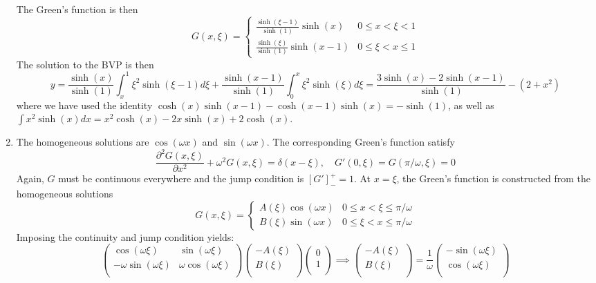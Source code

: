 \documentclass[a4paper]{article}
\begin{document}
\begin{ans}
\begin{enumerate}[label=(\alph*)]
The Green's function is then 
$$G(x,\xi)=
\left\{
        \begin{array}{ll}
      \frac{\sinh(\xi-1)}{\sinh(1)}\sinh(x) & 0\leq x<\xi<1 \\
      \frac{\sinh(\xi)}{\sinh(1)}\sinh(x-1) & 0\leq\xi< x\leq 1 
        \end{array}
    \right.$$
The solution to the BVP is then
$$y=\frac{\sinh(x)}{\sinh(1)}\int_x^1\xi^2\sinh(\xi-1)d\xi+\frac{\sinh(x-1)}{\sinh(1)}\int_0^x\xi^2\sinh(\xi)d\xi=\frac{3\sinh(x)-2\sinh(x-1)}{\sinh(1)}-(2+x^2)$$
where we have used the identity $\cosh(x)\sinh(x-1)-\cosh(x-1)\sinh(x)=-\sinh(1)$, as well as $\int x^2\sinh(x)dx=x^2\cosh(x)-2x\sinh(x)+2\cosh(x)$.
\item The homogeneous solutions are $\cos(\omega x)$ and $\sin(\omega x)$. 
The corresponding Green's function satisfy
$$\frac{\partial^2G(x,\xi)}{\partial x^2}+\omega^2G(x,\xi)=\delta(x-\xi),\quad G'(0,\xi)=G(\pi/\omega,\xi)=0$$
Again, $G$ must be continuous everywhere and the jump condition is $[G']_-^+=1$. At $x=\xi$, the Green's function is constructed from the homogeneous solutions
$$G(x,\xi)=
\left\{
        \begin{array}{ll}
      A(\xi)\cos(\omega x) & 0\leq x<\xi\leq\pi/\omega \\
      B(\xi)\sin(\omega x) & 0\leq\xi< x\leq\pi/\omega 
        \end{array}
    \right.$$
Imposing the continuity and jump condition yields:
$$\begin{pmatrix}\cos(\omega\xi)&\sin(\omega\xi)\\-\omega\sin(\omega\xi)&\omega\cos(\omega\xi)\\\end{pmatrix}\begin{pmatrix}-A(\xi)\\B(\xi)\\\end{pmatrix}\begin{pmatrix}0\\1\\\end{pmatrix}\implies\begin{pmatrix}-A(\xi)\\B(\xi)\\\end{pmatrix}=\frac{1}{\omega}\begin{pmatrix}-\sin(\omega\xi)\\\cos(\omega\xi)\\\end{pmatrix}$$

\end{enumerate}
\end{ans}
\end{document}
